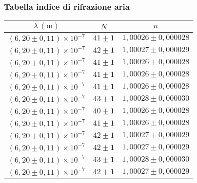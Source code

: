 \subsubsection{Tabella indice di rifrazione aria}
    \begin{table}[H]
    \centering
        \begin{tabular}{|c|c|c|}
        \hline
        $ \lambda \, (\text{m}) $ & $ N $ & $ n $ \\
        \hline
        $ (6,20 \pm 0,11) \times 10^{-7} $ & $ 41 \pm 1 $ & $ 1,00026 \pm 0,000028 $ \\
        \hline
        $ (6,20 \pm 0,11) \times 10^{-7} $ & $ 42 \pm 1 $ & $ 1,00027 \pm 0,000029 $ \\
        \hline
        $ (6,20 \pm 0,11) \times 10^{-7} $ & $ 41 \pm 1 $ & $ 1,00026 \pm 0,000028 $ \\
        \hline
        $ (6,20 \pm 0,11) \times 10^{-7} $ & $ 41 \pm 1 $ & $ 1,00026 \pm 0,000028 $ \\
        \hline
        $ (6,20 \pm 0,11) \times 10^{-7} $ & $ 41 \pm 1 $ & $ 1,00026 \pm 0,000028 $ \\
        \hline
        $ (6,20 \pm 0,11) \times 10^{-7} $ & $ 43 \pm 1 $ & $ 1,00028 \pm 0,000030 $ \\
        \hline
        $ (6,20 \pm 0,11) \times 10^{-7} $ & $ 40 \pm 1 $ & $ 1,00026 \pm 0,000028 $ \\
        \hline
        $ (6,20 \pm 0,11) \times 10^{-7} $ & $ 41 \pm 1 $ & $ 1,00026 \pm 0,000028 $ \\
        \hline
        $ (6,20 \pm 0,11) \times 10^{-7} $ & $ 42 \pm 1 $ & $ 1,00027 \pm 0,000029 $ \\
        \hline
        $ (6,20 \pm 0,11) \times 10^{-7} $ & $ 42 \pm 1 $ & $ 1,00027 \pm 0,000029 $ \\
        \hline
        $ (6,20 \pm 0,11) \times 10^{-7} $ & $ 43 \pm 1 $ & $ 1,00028 \pm 0,000030 $ \\
        \hline
        $ (6,20 \pm 0,11) \times 10^{-7} $ & $ 42 \pm 1 $ & $ 1,00027 \pm 0,000029 $ \\
        \hline
        \end{tabular}
    \end{table}